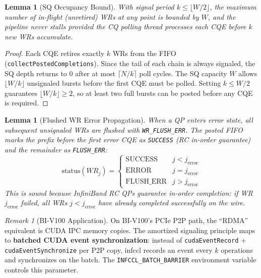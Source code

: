 \documentclass[11pt,a4paper,twoside]{article}
\theoremstyle{plain}
\newtheorem{lemma}[theorem]{Lemma}
\theoremstyle{definition}
\theoremstyle{remark}
\newtheorem{remark}[theorem]{Remark}
\begin{document}
\begin{lemma}[SQ Occupancy Bound]
\label{lem:sq-occupancy}
With signal period $k \leq \lfloor W/2 \rfloor$, the maximum number of in-flight
(unretired) WRs at any point is bounded by $W$, and the pipeline never stalls provided
the CQ polling thread processes each CQE before $k$ new WRs accumulate.
\end{lemma}

\begin{proof}
Each CQE retires exactly $k$ WRs from the FIFO (\texttt{collectPostedCompletions}).
Since the tail of each chain is always signaled, the SQ depth returns to 0 after at most
$\lceil N/k \rceil$ poll cycles.  The SQ capacity $W$ allows $\lfloor W/k \rfloor$
unsignaled bursts before the first CQE must be polled.  Setting $k \leq W/2$ guarantees
$\lfloor W/k \rfloor \geq 2$, so at least two full bursts can be posted before any
CQE is required.
\end{proof}

\begin{lemma}[Flushed WR Error Propagation]
\label{lem:flush-err}
When a QP enters error state, all subsequent unsignaled WRs are flushed with
\texttt{WR\_FLUSH\_ERR}. The posted FIFO marks the prefix before the first error CQE as
\texttt{SUCCESS} (RC in-order guarantee) and the remainder as \texttt{FLUSH\_ERR}:
\begin{equation}
  \text{status}(WR_j) =
  \begin{cases}
    \text{SUCCESS} & j < j_{\text{error}} \\
    \text{ERROR} & j = j_{\text{error}} \\
    \text{FLUSH\_ERR} & j > j_{\text{error}}
  \end{cases}
\end{equation}
This is sound because InfiniBand RC QPs guarantee in-order completion: if WR $j_{\text{error}}$
failed, all WRs $j < j_{\text{error}}$ have already completed successfully on the wire.
\end{lemma}

\begin{remark}[BI-V100 Application]
On BI-V100's PCIe P2P path, the ``RDMA'' equivalent is CUDA IPC memory copies.
The amortized signaling principle maps to \textbf{batched CUDA event synchronization}:
instead of \texttt{cudaEventRecord} + \texttt{cudaEventSynchronize} per P2P copy,
infccl records an event every $k$ operations and synchronizes on the batch.
The \texttt{INFCCL\_BATCH\_BARRIER} environment variable controls this parameter.
\end{remark}
\end{document}
